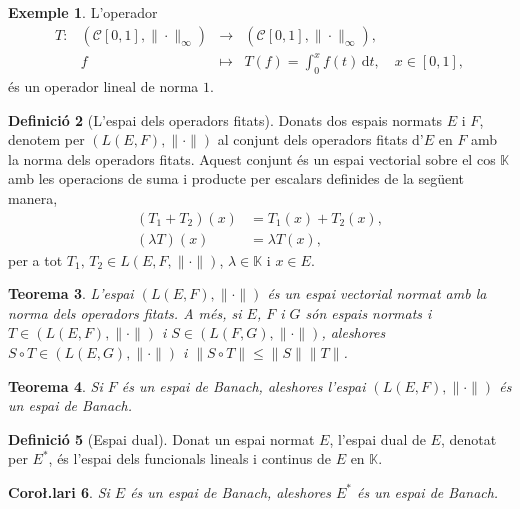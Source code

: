 \documentclass[12pt]{book}
\newtheorem{teorema}{Teorema}[chapter]
\newtheorem{coro}[teorema]{Coro\l.lari}
\theoremstyle{definition}
\newtheorem{defi}[teorema]{Definició}
\theoremstyle{nota}
\theoremstyle{exemple}
\newtheorem{exemple}[teorema]{Exemple}
\begin{document}
\begin{exemple}
  L'operador
  \[
    \begin{array}{lrcl}
      T : & (\mathcal{C}[0,1], \|\cdot\|_\infty) &\longrightarrow& (\mathcal{C}[0,1], \|\cdot\|_\infty), \\
      & f &\longmapsto& T(f) = \int_0^x f(t)\, \mathrm{d}t, \quad x \in [0,1],
    \end{array}
  \]
  és un operador lineal de norma $1$.
\end{exemple}

\begin{defi}[L'espai dels operadors fitats]
  Donats dos espais normats $E$ i $F$, denotem per
  $(L(E,F), \|\cdot\|)$ al conjunt dels operadors fitats d'$E$ en $F$
  amb la norma dels operadors fitats. Aquest conjunt és un espai
  vectorial sobre el cos $\mathbb{K}$ amb les operacions de suma i
  producte per escalars definides de la següent manera,
  \begin{align*}
    (T_1 + T_2)(x) &= T_1(x) + T_2(x), \\
    (\lambda T)(x) &= \lambda T(x),
  \end{align*}
  per a tot $T_1,\, T_2 \in L(E, F, \|\cdot\|)$,
  $\lambda \in \mathbb{K}$ i $x \in E$.
\end{defi}

\begin{teorema}
  L'espai $(L(E,F), \|\cdot\|)$ és un espai vectorial normat amb la
  norma dels operadors fitats. A més, si $E$, $F$ i $G$ són espais
  normats i $T \in (L(E,F), \|\cdot\|)$ i $S \in (L(F,G), \|\cdot\|)$,
  aleshores $S \circ T \in (L(E,G), \|\cdot\|)$ i
  $\|S \circ T\| \leq \|S\| \|T\|$.
\end{teorema}

\begin{teorema}
  Si $F$ és un espai de Banach, aleshores l'espai
  $(L(E,F), \|\cdot\|)$ és un espai de Banach.
\end{teorema}

\begin{defi}[Espai dual]
  Donat un espai normat $E$, l'espai dual de $E$, denotat per $E^*$,
  és l'espai dels funcionals lineals i continus de $E$ en
  $\mathbb{K}$.
\end{defi}

\begin{coro}
  Si $E$ és un espai de Banach, aleshores $E^*$ és un espai de Banach.
\end{coro}
\end{document}
